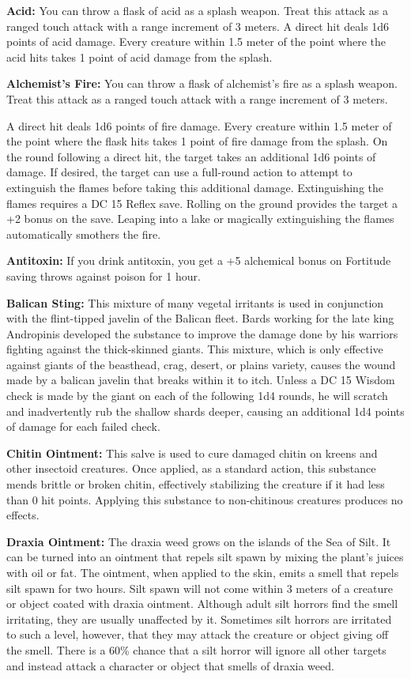 \textbf{Acid:} You can throw a flask of acid as a splash weapon. Treat this attack as a ranged touch attack with a range increment of 3 meters. A direct hit deals 1d6 points of acid damage. Every creature within 1.5 meter of the point where the acid hits takes 1 point of acid damage from the splash.

\textbf{Alchemist's Fire:} You can throw a flask of alchemist's fire as a splash weapon. Treat this attack as a ranged touch attack with a range increment of 3 meters.

A direct hit deals 1d6 points of fire damage. Every creature within 1.5 meter of the point where the flask hits takes 1 point of fire damage from the splash. On the round following a direct hit, the target takes an additional 1d6 points of damage. If desired, the target can use a full-round action to attempt to extinguish the flames before taking this additional damage. Extinguishing the flames requires a DC 15 Reflex save. Rolling on the ground provides the target a +2 bonus on the save. Leaping into a lake or magically extinguishing the flames automatically smothers the fire.

\textbf{Antitoxin:} If you drink antitoxin, you get a +5 alchemical bonus on Fortitude saving throws against poison for 1 hour.

\textbf{Balican Sting:} This mixture of many vegetal irritants is used in conjunction with the flint-tipped javelin of the Balican fleet. Bards working for the late king Andropinis developed the substance to improve the damage done by his warriors fighting against the thick-skinned giants. This mixture, which is only effective against giants of the beasthead, crag, desert, or plains variety, causes the wound made by a balican javelin that breaks within it to itch. Unless a DC 15 Wisdom check is made by the giant on each of the following 1d4 rounds, he will scratch and inadvertently rub the shallow shards deeper, causing an additional 1d4 points of damage for each failed check.

\textbf{Chitin Ointment:} This salve is used to cure damaged chitin on kreens and other insectoid creatures. Once applied, as a standard action, this substance mends brittle or broken chitin, effectively stabilizing the creature if it had less than 0 hit points. Applying this substance to non-chitinous creatures produces no effects.

\textbf{Draxia Ointment:} The draxia weed grows on the islands of the Sea of Silt. It can be turned into an ointment that repels silt spawn by mixing the plant's juices with oil or fat. The ointment, when applied to the skin, emits a smell that repels silt spawn for two hours. Silt spawn will not come within 3 meters of a creature or object coated with draxia ointment. Although adult silt horrors find the smell irritating, they are usually unaffected by it. Sometimes silt horrors are irritated to such a level, however, that they may attack the creature or object giving off the smell. There is a 60\% chance that a silt horror will ignore all other targets and instead attack a character or object that smells of draxia weed.

